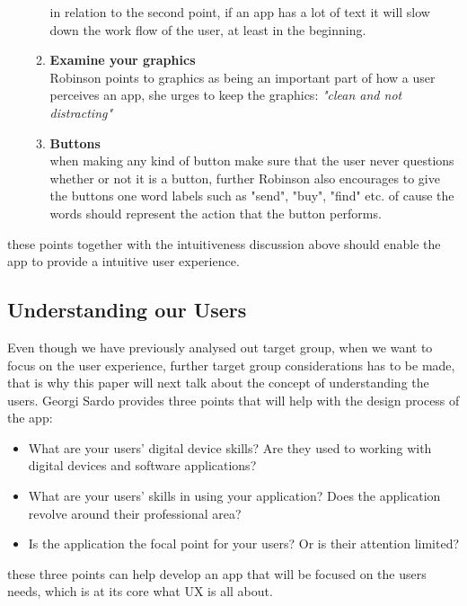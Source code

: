 \begin{itemize}
\begin{enumerate}
 in relation to the second point, if an app has a lot of text it will slow down the work flow of the user, at least in the beginning.
 \item \textbf{Examine your graphics}\\
 Robinson points to graphics as being an important part of how a user perceives an app, she urges to keep the graphics: \textit{"clean and not distracting"} 
 \item \textbf{Buttons}\\
 when making any kind of button make sure that the user never questions whether or not it is a button, further Robinson also encourages to give the buttons one word labels such as "send", "buy", "find" etc. of cause the words should represent the action that the button performs.
 \end{enumerate}\cite{UXKeys} 
\end{itemize} 
these points together with the intuitiveness discussion above should enable the app to provide a intuitive user experience. 

\subsection{Understanding our Users}
Even though we have previously analysed out target group, when we want to focus on the user experience, further target group considerations has to be made, that is why this paper will next talk about the concept of understanding the users. Georgi Sardo provides three points that will help with the design process of the app:
\begin{itemize}
\item What are your users’ digital device skills? Are they used to working with digital devices and software applications?\cite{Sardo}
\item What are your users’ skills in using your application? Does the application revolve around their professional area?\cite{Sardo}
\item Is the application the focal point for your users? Or is their attention limited?\cite{Sardo}
\end{itemize}
these three points can help develop an app that will be focused on the users needs, which is at its core what UX is all about.